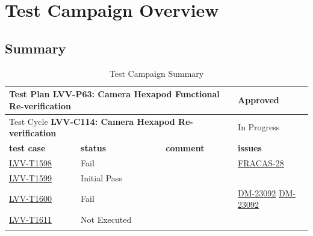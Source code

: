 \documentclass[SE,lsstdraft,STR,toc]{lsstdoc}
\begin{document}
\newpage

\section{Test Campaign Overview}
\label{sect:overview}

\subsection{Summary}
\label{sect:summarytable}

\begin{longtable}{p{2cm}p{2.5cm}p{9cm}p{2.5cm}}
\toprule
\multicolumn{3}{l}{ Test Plan {\bf LVV-P63: Camera Hexapod Functional Re-verification
 }} & Approved \\\hline

  \multicolumn{3}{l}{ Test Cycle {\bf LVV-C114: Camera Hexapod Re-verification
 }} & In Progress \\\hline

  {\bf \footnotesize test case} & {\bf \footnotesize status} & {\bf \footnotesize comment} & {\bf \footnotesize issues} \\\toprule

    \href{https://jira.lsstcorp.org/secure/Tests.jspa#/testCase/LVV-T1598}{LVV-T1598}
    & Fail &
    \begin{minipage}[]{9cm}
    \smallskip
    
    \medskip
    \end{minipage}
    &
          \href{https://jira.lsstcorp.org/browse/FRACAS-28}{FRACAS-28}
    \\\hline
    \href{https://jira.lsstcorp.org/secure/Tests.jspa#/testCase/LVV-T1599}{LVV-T1599}
    & Initial Pass &
    \begin{minipage}[]{9cm}
    \smallskip
    
    \medskip
    \end{minipage}
    &
    \\\hline
    \href{https://jira.lsstcorp.org/secure/Tests.jspa#/testCase/LVV-T1600}{LVV-T1600}
    & Fail &
    \begin{minipage}[]{9cm}
    \smallskip
    
    \medskip
    \end{minipage}
    &
          \href{https://jira.lsstcorp.org/browse/DM-23092}{DM-23092}
          \href{https://jira.lsstcorp.org/browse/DM-23092}{DM-23092}
    \\\hline
    \href{https://jira.lsstcorp.org/secure/Tests.jspa#/testCase/LVV-T1611}{LVV-T1611}
    & Not Executed &
    \begin{minipage}[]{9cm}
    \smallskip
    
    \medskip
    \end{minipage}
    &
    \\\hline
\caption{Test Campaign Summary}
\label{table:summary}
\end{longtable}
\end{document}
